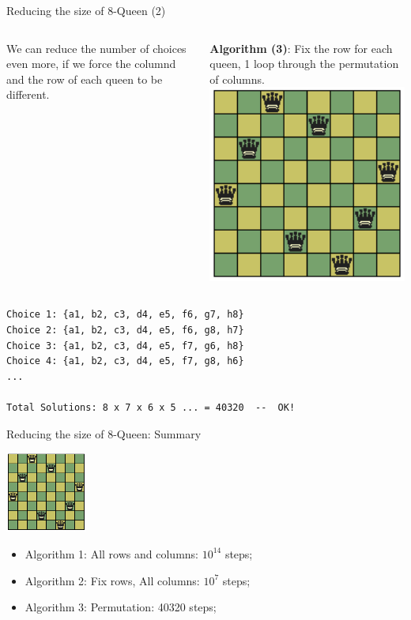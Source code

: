 \begin{frame}[fragile]{Reducing the size of 8-Queen (2)}
  \begin{columns}
      We can reduce the number of choices even more, if we force the columnd and the row of each queen to be different.\bigskip

    {\bf Algorithm (3)}: Fix the row for each queen, 1 loop through the \alert{permutation} of columns.
    \includegraphics[width=1\textwidth]{img/8queen}
  \end{columns}
\begin{verbatim}
Choice 1: {a1, b2, c3, d4, e5, f6, g7, h8}
Choice 2: {a1, b2, c3, d4, e5, f6, g8, h7}
Choice 3: {a1, b2, c3, d4, e5, f7, g6, h8}
Choice 4: {a1, b2, c3, d4, e5, f7, g8, h6}
...

Total Solutions: 8 x 7 x 6 x 5 ... = 40320  --  OK!
\end{verbatim}
\end{frame}

\begin{frame}{Reducing the size of 8-Queen: Summary}

  \hfill \includegraphics[width=0.2\textwidth]{img/8queen}
  \begin{itemize}
    \item Algorithm 1: All rows and columns: $10^{14}$ steps;
    \item Algorithm 2: Fix rows, All columns: $10^{7}$ steps;
    \item Algorithm 3: Permutation: 40320 steps;
  \end{itemize}
\end{frame}

